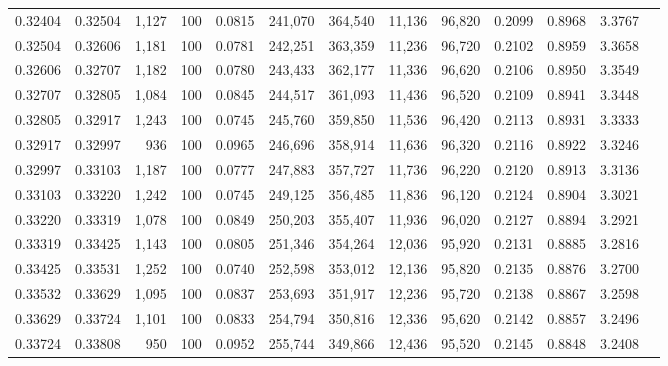 \begin{tabular}{rrrrrrrrrrrrr}
0.32404 & 0.32504 & 1,127 & 100 &                                     0.0815 & 241,070 & 364,540 &  11,136 &  96,820 & 0.2099 & 0.8968 & 3.3767 \\
0.32504 & 0.32606 & 1,181 & 100 &                                     0.0781 & 242,251 & 363,359 &  11,236 &  96,720 & 0.2102 & 0.8959 & 3.3658 \\
0.32606 & 0.32707 & 1,182 & 100 &                                     0.0780 & 243,433 & 362,177 &  11,336 &  96,620 & 0.2106 & 0.8950 & 3.3549 \\
0.32707 & 0.32805 & 1,084 & 100 &                                     0.0845 & 244,517 & 361,093 &  11,436 &  96,520 & 0.2109 & 0.8941 & 3.3448 \\
0.32805 & 0.32917 & 1,243 & 100 &                                     0.0745 & 245,760 & 359,850 &  11,536 &  96,420 & 0.2113 & 0.8931 & 3.3333 \\
0.32917 & 0.32997 &   936 & 100 &                                     0.0965 & 246,696 & 358,914 &  11,636 &  96,320 & 0.2116 & 0.8922 & 3.3246 \\
0.32997 & 0.33103 & 1,187 & 100 &                                     0.0777 & 247,883 & 357,727 &  11,736 &  96,220 & 0.2120 & 0.8913 & 3.3136 \\
0.33103 & 0.33220 & 1,242 & 100 &                                     0.0745 & 249,125 & 356,485 &  11,836 &  96,120 & 0.2124 & 0.8904 & 3.3021 \\
0.33220 & 0.33319 & 1,078 & 100 &                                     0.0849 & 250,203 & 355,407 &  11,936 &  96,020 & 0.2127 & 0.8894 & 3.2921 \\
0.33319 & 0.33425 & 1,143 & 100 &                                     0.0805 & 251,346 & 354,264 &  12,036 &  95,920 & 0.2131 & 0.8885 & 3.2816 \\
0.33425 & 0.33531 & 1,252 & 100 &                                     0.0740 & 252,598 & 353,012 &  12,136 &  95,820 & 0.2135 & 0.8876 & 3.2700 \\
0.33532 & 0.33629 & 1,095 & 100 &                                     0.0837 & 253,693 & 351,917 &  12,236 &  95,720 & 0.2138 & 0.8867 & 3.2598 \\
0.33629 & 0.33724 & 1,101 & 100 &                                     0.0833 & 254,794 & 350,816 &  12,336 &  95,620 & 0.2142 & 0.8857 & 3.2496 \\
0.33724 & 0.33808 &   950 & 100 &                                     0.0952 & 255,744 & 349,866 &  12,436 &  95,520 & 0.2145 & 0.8848 & 3.2408 \\

\end{tabular}
